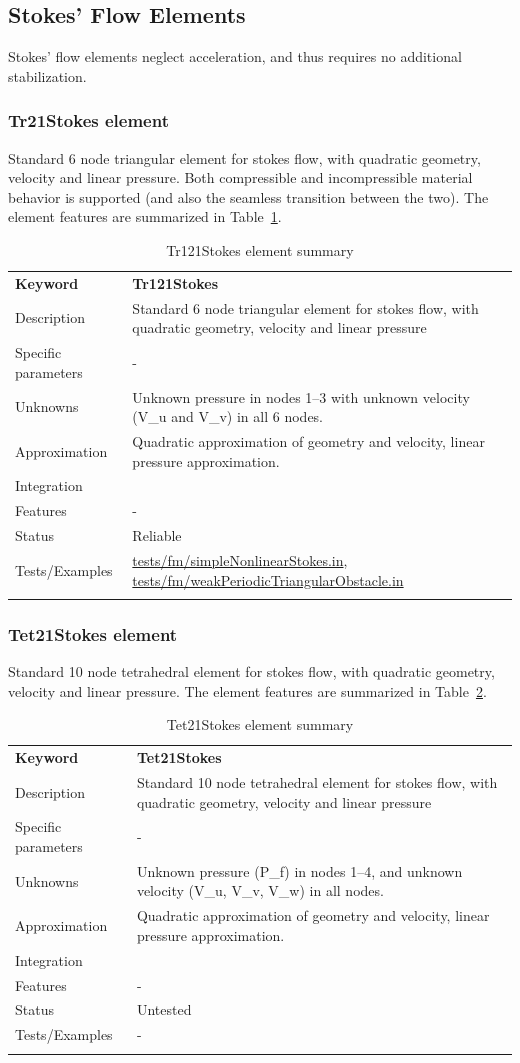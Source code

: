 \documentclass[a4paper]{article}
\newcommand{\param}[1]{\texttt{#1}} %
\newcommand{\templabel}{}%
\newcommand{\tempcaption}{}%
\newcounter{nelpar}
\newenvironment{elementsummary}[5]{%
  \gdef\tempcaption{#4}%
  \gdef\templabel{#5}%
  \setcounter{nelpar}{0}%
  \begin{center} %
    \begin{table}[!htb] %
      \begin{tabular}{|l|p{9cm}|}\hline %
        {\bf Keyword} & \bf{#1}\\ %
        {Description} & {#2}\\ %
        {Specific parameters} & {#3}\\ \hline %
}{
  \\ \hline %
      \end{tabular}%
      \caption{\tempcaption}%
      \label{\templabel}%
    \end{table}%
  \end{center}%
}
\newcommand{\elementParam}[1]{%
  \ifthenelse{\value{nelpar}>0} %
             {&{#1}}%
             {\setcounter{nelpar}{1}Parameters&{#1}}%
             \\%
}
\newcommand{\elementDescription}[2]{{#1} & {#2}\\}
\begin{document}
\subsection{Stokes' Flow Elements}
Stokes' flow elements neglect acceleration, and thus requires no additional stabilization.

\subsubsection{Tr21Stokes element}
Standard 6 node triangular element for stokes flow, with quadratic geometry, velocity and linear pressure.
Both compressible and incompressible material behavior is supported (and also the seamless transition between the two).
The element features are summarized in Table~\ref{Tr121Stokessummary}.

\begin{elementsummary}{Tr121Stokes}{Standard 6 node triangular element for stokes flow, with quadratic geometry, velocity and linear pressure}{-}{Tr121Stokes element summary}{Tr121Stokessummary}
\elementDescription{Unknowns}{Unknown pressure in nodes 1--3 with unknown velocity (V\_u and V\_v) in all 6 nodes.}
\elementDescription{Approximation}{Quadratic approximation of geometry and velocity, linear pressure approximation.}
\elementDescription{Integration}{}
\elementDescription{Features}{-}
\elementDescription{Status}{Reliable}
\elementDescription{Tests/Examples}{\href{https://github.com/oofem/oofem/blob/devel/tests/fm/simpleNonlinearStokes.in}{tests/fm/simpleNonlinearStokes.in},
  \href{https://github.com/oofem/oofem/blob/devel/tests/fm/weakPeriodicTriangularObstacle.in}{tests/fm/weakPeriodicTriangularObstacle.in}
}
\end{elementsummary}

\subsubsection{Tet21Stokes element}
Standard 10 node tetrahedral element for stokes flow, with quadratic geometry, velocity and linear pressure. The element features are summarized in Table~\ref{Tet21Stokessummary}.

\begin{elementsummary}{Tet21Stokes}{Standard 10 node tetrahedral element for stokes flow, with quadratic geometry, velocity and linear pressure}{-}{Tet21Stokes element summary}{Tet21Stokessummary}
\elementDescription{Unknowns}{Unknown pressure (P\_f) in nodes 1--4, and unknown velocity (V\_u, V\_v, V\_w) in all nodes.}
\elementDescription{Approximation}{Quadratic approximation of geometry and velocity, linear pressure approximation.}
\elementDescription{Integration}{}
\elementDescription{Features}{-}
\elementDescription{Status}{Untested}
\elementDescription{Tests/Examples}{-}
\end{elementsummary}
\end{document}
